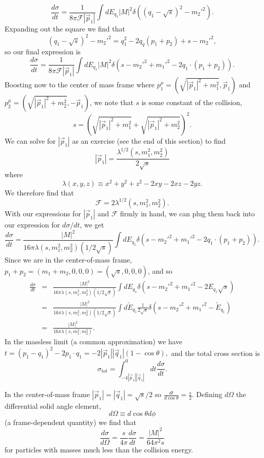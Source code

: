$$\frac{d\sigma}{dt}=\frac{1}{8\pi \mathcal{F}|\vec p_1|}\int dE_{q_1}|M|^2 \delta((q_1-\sqrt{s})^2-{m_2'}^2).$$
Expanding out the square we find that
$$(q_1-\sqrt{s})^2-{m_2'}^2=q_1^2-2q_q(p_1+p_2)+s-{m_2'}^2,$$
so our final expression is
$$\frac{d\sigma}{dt}=\frac{1}{8\pi \mathcal{F}|\vec p_1|}\int dE_{q_1}|M|^2 \delta(s-{m_2'}^2 +{m_1'}^2-2q_1 \cdot(p_1+p_2)).$$
Boosting now to the center of mass frame where $p_1^\mu=(\sqrt{|\vec p_1|^2+m_1^2},\vec p_1)$ and $p_2^\mu=(\sqrt{|\vec p_1|^2+m_2^2},-\vec p_1)$, we note that $s$ is some constant of the collision,
$$s=\left(\sqrt{|\vec p_1|^2+m_1^2}+\sqrt{|\vec p_1|^2+m_2^2}\right)^2.$$
We can solve for $|\vec p_1|$ as an exercise (see the end of this section) to find
$$|\vec p_1|=\frac{\lambda^{1/2}(s,m_1^2,m_2^2)}{2\sqrt{s}}$$
where $$\lambda(x,y,z)\equiv x^2+y^2+z^2-2xy-2xz-2yz.$$ We therefore find that
$$\mathcal{F}=2\lambda^{1/2}(s,m_1^2,m_2^2).$$ With our expressions for $|\vec p_1|$ and $\mathcal{F}$ firmly in hand, we can plug them back into our expression for $d\sigma/dt$, we get
$$\frac{d\sigma}{dt}=\frac{|M|^2}{16\pi \lambda(s,m_1^2,m_2^2)(1/2\sqrt{s})}\int dE_{q_1} \delta(s-{m_2'}^2+{m_1'}^2-2q_1\cdot(p_1+p_2)).$$
Since we are in the center-of-mass frame, $p_1+p_2=(m_1+m_2,0,0,0)=(\sqrt{s},0,0,0)$, and so 
\begin{eqnarray*}
\frac{d\sigma}{dt}&=&\frac{|M|^2}{16\pi \lambda(s,m_1^2,m_2^2)(1/2\sqrt{s})}\int dE_{q_1} \delta(s-{m_2'}^2+{m_1'}^2-2E_{q_1}\sqrt{s})\\
&=&\frac{|M|^2}{16\pi \lambda(s,m_1^2,m_2^2)(1/2\sqrt{s})} \int d\tilde E_{q_1} \frac{1}{2\sqrt{s}} \delta(s-{m_2'}^2+{m_1'}^2-\tilde E_{q_1})\\
&=&\frac{|M|^2}{16\pi\lambda(s,m_1^2,m_2^2)}.
\end{eqnarray*}
In the massless limit (a common approximation) we have $t=(p_1-q_1)^2-2p_1\cdot q_1 =-2|\vec p_1||\vec q_1|(1-\cos\theta),$ and the total cross section is
$$\sigma_{tot}=\int_{-4|\vec p_1||\vec q_1|}^0 dt \frac{d\sigma}{dt}.$$

In the center-of-mass frame $|\vec p_1|=|\vec q_1|=\sqrt{s}/2$ so $\frac{dt}{d\cos\theta}=\frac{s}{2}$. Defining $d\Omega$ the differential solid angle element,
$$d\Omega\equiv d\cos\theta d\phi$$ (a frame-dependent quantity) we find that
$$\frac{d\sigma}{d\Omega}=\frac{s}{4\pi}\frac{d\sigma}{dt}=\frac{|M|^2}{64\pi^2 s}$$
for particles with masses much less than the collision energy.

